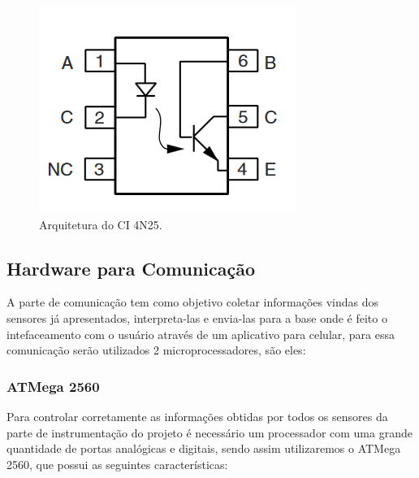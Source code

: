     \begin{figure}[H]                                                           
      		\centering                    
      		\includegraphics[scale=0.5]{figuras/optacoplador.png}               
      		\caption{Arquitetura do CI 4N25.}    
      		\label{img:optacoplador}                                            
    	\end{figure}     



\subsection{Hardware para Comunicação}
\label{sub:Hardwar_para_Comunicação}
  A parte de comunicação tem como objetivo coletar informações vindas dos sensores já apresentados, interpreta-las e envia-las para a base onde é feito o intefaceamento com o usuário através de um aplicativo para celular, para essa comunicação serão utilizados 2 microprocessadores, são eles:

    \subsubsection{ATMega 2560}
    Para controlar corretamente as informações obtidas por todos os sensores da parte de instrumentação do projeto é necessário um processador com uma grande quantidade de portas analógicas e digitais, sendo assim utilizaremos o ATMega 2560, que possui as seguintes características:


